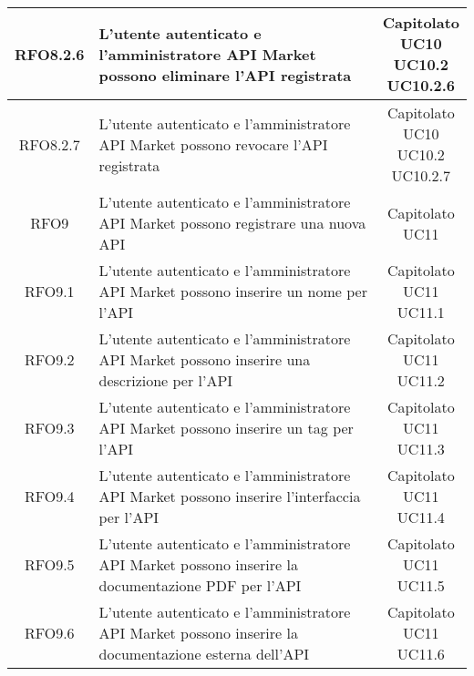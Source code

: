 \begin{longtable}{|c|p{8cm}|c|}
RFO8.2.6 &  L'utente autenticato e l'amministratore API Market possono eliminare l'API registrata & \makecell*{Capitolato\\UC10\\UC10.2\\UC10.2.6} \\
\hline

RFO8.2.7 &  L'utente autenticato e l'amministratore API Market possono revocare l'API registrata & \makecell*{Capitolato\\UC10\\UC10.2\\UC10.2.7} \\
\hline

RFO9 &  L'utente autenticato e l'amministratore API Market possono registrare una nuova API & \makecell*{Capitolato\\UC11} \\
\hline

RFO9.1 &  L'utente autenticato e l'amministratore API Market possono inserire un nome per l'API & \makecell*{Capitolato\\UC11\\UC11.1} \\
\hline

RFO9.2 &  L'utente autenticato e l'amministratore API Market possono inserire una descrizione per l'API & \makecell*{Capitolato\\UC11\\UC11.2} \\
\hline

RFO9.3 &  L'utente autenticato e l'amministratore API Market possono inserire un tag per l'API & \makecell*{Capitolato\\UC11\\UC11.3} \\
\hline

RFO9.4 &  L'utente autenticato e l'amministratore API Market possono inserire l'interfaccia per l'API & \makecell*{Capitolato\\UC11\\UC11.4} \\
\hline

RFO9.5 &  L'utente autenticato e l'amministratore API Market possono inserire la documentazione PDF per l'API & \makecell*{Capitolato\\UC11\\UC11.5} \\
\hline

RFO9.6 &  L'utente autenticato e l'amministratore API Market possono inserire la documentazione esterna dell'API & \makecell*{Capitolato\\UC11\\UC11.6} \\
\hline


\end{longtable}
